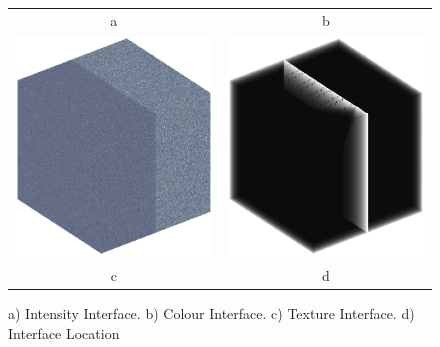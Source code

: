 \documentclass[9pt]{beamer}
\begin{document}
\begin{frame}
\begin{figure}
\begin{tabular}{c c}
					a & b\\		
					\includegraphics[scale=0.2]{statinterface} &	
					\includegraphics[scale=0.2]{edge3d2}\\
					c & d							
			\end{tabular}						
					\caption{ a) Intensity Interface. b) Colour Interface. c) Texture Interface. d) Interface Location}
			\end{figure}	
\end{frame}
\end{document}
